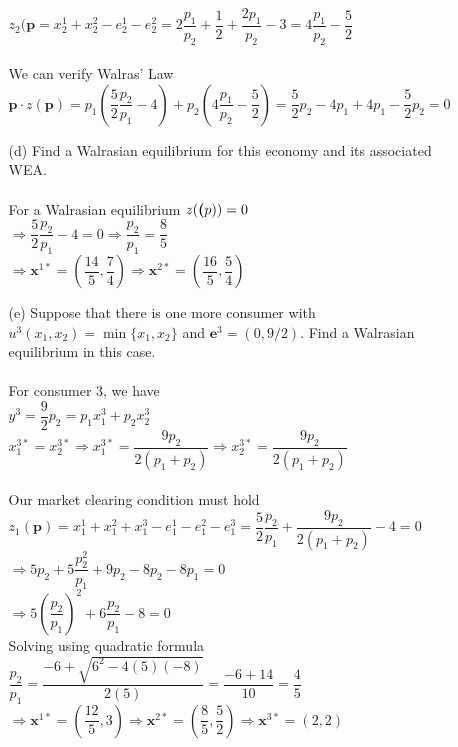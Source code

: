 \documentclass[11pt]{article}
\begin{document}
\begin{enumerate}
\begin{itemize}
	$z_2(\textbf{p}=x_2^1+x_2^2-e_2^1-e_2^2=2\dfrac{p_1}{p_2}+\dfrac{1}{2}+\dfrac{2p_1}{p_2}-3=4\dfrac{p_1}{p_2}-\dfrac{5}{2}$\\\\
	We can verify Walras' Law\\
	$\textbf{p}\cdot z(\textbf{p})=p_1(\dfrac{5}{2}\dfrac{p_2}{p_1}-4)+p_2(4\dfrac{p_1}{p_2}-\dfrac{5}{2})=\dfrac{5}{2}p_2-4p_1+4p_1-\dfrac{5}{2}p_2=0$\\
	\item[(d)] Find a Walrasian equilibrium for this economy and its associated WEA.
	\smallskip\\\\
	For a Walrasian equilibrium $z(\textbf(p))=0$\\
	$\Rightarrow\dfrac{5}{2}\dfrac{p_2}{p_1}-4=0\Rightarrow\dfrac{p_2}{p_1}=\dfrac{8}{5}$\\
	$\Rightarrow\textbf{x}^{1*}=(\dfrac{14}{5},\dfrac{7}{4})\Rightarrow\textbf{x}^{2*}=(\dfrac{16}{5},\dfrac{5}{4})$
	\item[(e)] Suppose that there is one more consumer with $u^{3}(x_{1},x_{2})=\min\{x_{1},x_{2}\}$ and $\mathbf{e}^{3}=(0,9/2)$. Find a Walrasian equilibrium in this case.
	\smallskip\\\\
	For consumer 3, we have\\
	$y^3=\dfrac{9}{2}p_2=p_1x_1^3+p_2x_2^3$\\
	$x_1^{3*}=x_2^{3*}\Rightarrow x_1^{3*}=\dfrac{9p_2}{2(p_1+p_2)}\Rightarrow x_2^{3*}=\dfrac{9p_2}{2(p_1+p_2)}$\\\\
	Our market clearing condition must hold\\
	$z_1(\textbf{p})=x_1^1+x_1^2+x_1^3-e_1^1-e_1^2-e_1^3=\dfrac{5}{2}\dfrac{p_2}{p_1}+\dfrac{9p_2}{2(p_1+p_2)}-4=0$\\
	$\Rightarrow 5p_2+5\dfrac{p_2^2}{p_1}+9p_2-8p_2-8p_1=0$\\
	$\Rightarrow 5(\dfrac{p_2}{p_1})^2+6\dfrac{p_2}{p_1}-8=0$\\
	Solving using quadratic formula\\
	$\dfrac{p_2}{p_1}=\dfrac{-6+\sqrt{6^2-4(5)(-8)}}{2(5)}=\dfrac{-6+14}{10}=\dfrac{4}{5}$\\
	$\Rightarrow\textbf{x}^{1*}=(\dfrac{12}{5},3)\Rightarrow\textbf{x}^{2*}=(\dfrac{8}{5},\dfrac{5}{2})\Rightarrow\textbf{x}^{3*}=(2,2)$
	
	\end{itemize}

\end{enumerate}
\end{document}
